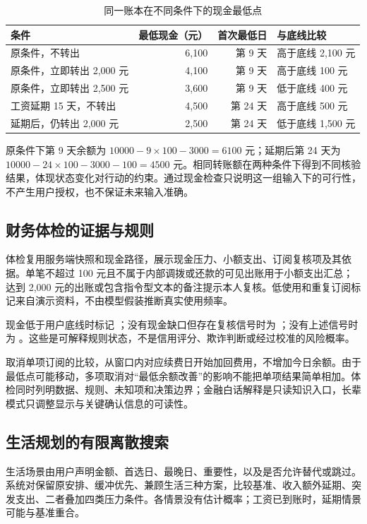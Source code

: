 \begin{table}[htbp]\centering\small
\caption{同一账本在不同条件下的现金最低点}
\begin{tabularx}{\textwidth}{@{}YrrY@{}}\toprule
条件 & 最低现金（元） & 首次最低日 & 与底线比较 \\\midrule
原条件，不转出 & 6,100 & 第 9 天 & 高于底线 2,100 元 \\
原条件，立即转出 2,000 元 & 4,100 & 第 9 天 & 高于底线 100 元 \\
原条件，立即转出 2,500 元 & 3,600 & 第 9 天 & 低于底线 400 元 \\
工资延期 15 天，不转出 & 4,500 & 第 24 天 & 高于底线 500 元 \\
延期后，仍转出 2,000 元 & 2,500 & 第 24 天 & 低于底线 1,500 元 \\\bottomrule
\end{tabularx}
\end{table}
原条件下第 9 天余额为 $10000-9\times100-3000=6100$ 元；延期后第 24 天为 $10000-24\times100-3000-100=4500$ 元。相同转账额在两种条件下得到不同核验结果，体现状态变化对行动的约束。通过现金检查只说明这一组输入下的可行性，不产生用户授权，也不保证未来输入准确。

\subsection{财务体检的证据与规则}
体检复用服务端快照和现金路径，展示现金压力、小额支出、订阅复核项及其依据。单笔不超过 100 元且不属于内部调拨或还款的可见出账用于小额支出汇总；达到 2,000 元的出账或包含指令型文本的备注提示本人复核。低使用和重复订阅标记来自演示资料，不由模型假装推断真实使用频率。

现金低于用户底线时标记 ；没有现金缺口但存在复核信号时为 ；没有上述信号时为 。这些是可解释规则状态，不是信用评分、欺诈判断或经过校准的风险概率。

取消单项订阅的比较，从窗口内对应续费日开始加回费用，不增加今日余额。由于最低点可能移动，多项取消对“最低余额改善”的影响不能把单项结果简单相加。体检同时列明数据、规则、未知项和决策边界；金融白话解释是只读知识入口，长辈模式只调整显示与关键确认信息的可读性。

\subsection{生活规划的有限离散搜索}
生活场景由用户声明金额、首选日、最晚日、重要性，以及是否允许替代或跳过。系统对保留原安排、缓冲优先、兼顾生活三种方案，比较基准、收入额外延期、突发支出、二者叠加四类压力条件。各情景没有估计概率；工资已到账时，延期情景可能与基准重合。

